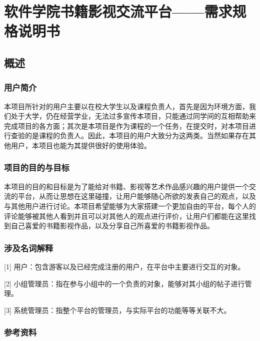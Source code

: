 \documentclass[
]{article}
\author{}
\date{}
\begin{document}
\hypertarget{header-n0}{%
\section{软件学院书籍影视交流平台------需求规格说明书}\label{header-n0}}

\hypertarget{header-n2}{%
\subsection{概述}\label{header-n2}}

\hypertarget{header-n3}{%
\subsubsection{用户简介}\label{header-n3}}

本项目所针对的用户主要以在校大学生以及课程负责人，首先是因为环境方面，我们处于大学，仍在经营学业，无法过多宣传本项目，只能通过同学间的互相帮助来完成项目的各方面；其次是本项目是作为课程的一个任务，在提交时，对本项目进行查验的是课程的负责人。因此，本项目的用户大致分为这两类。当然如果存在其他用户，本项目也能为其提供很好的使用体验。

\hypertarget{header-n5}{%
\subsubsection{项目的目的与目标}\label{header-n5}}

本项目的目的和目标是为了能给对书籍、影视等艺术作品感兴趣的用户提供一个交流的平台，从而让思想在这里碰撞，让用户能够随心所欲的发表自己的观点，以及与其他用户进行讨论。本项目希望能够为大家搭建一个更加自由的平台，每个人的评论能够被其他人看到并且可以对其他人的观点进行评价，让用户们都能在这里找到自己喜爱的书籍影视作品，以及分享自己所喜爱的书籍影视作品。

\hypertarget{header-n7}{%
\subsubsection{涉及名词解释}\label{header-n7}}

{[}1{]}
用户：包含游客以及已经完成注册的用户，在平台中主要进行交互的对象。

{[}2{]}
小组管理员：指在参与小组中的一个负责的对象，能够对其小组的帖子进行管理。

{[}3{]} 系统管理员：指整个平台的管理员，与实际平台的功能等等关联不大。

\hypertarget{header-n11}{%
\subsubsection{参考资料}\label{header-n11}}
\end{document}
